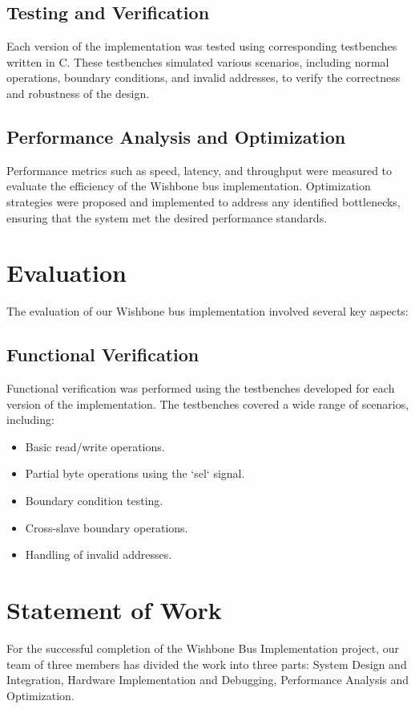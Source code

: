 \documentclass[12pt]{report}
\begin{document}
\subsection{Testing and Verification}
Each version of the implementation was tested using corresponding testbenches written in C. These testbenches simulated various scenarios, including normal operations, boundary conditions, and invalid addresses, to verify the correctness and robustness of the design.

\subsection{Performance Analysis and Optimization}
Performance metrics such as speed, latency, and throughput were measured to evaluate the efficiency of the Wishbone bus implementation. Optimization strategies were proposed and implemented to address any identified bottlenecks, ensuring that the system met the desired performance standards.




\section{Evaluation}

The evaluation of our Wishbone bus implementation involved several key aspects:

\subsection{Functional Verification}
Functional verification was performed using the testbenches developed for each version of the implementation. The testbenches covered a wide range of scenarios, including:
\begin{itemize}
    \item Basic read/write operations.
    \item Partial byte operations using the `sel` signal.
    \item Boundary condition testing.
    \item Cross-slave boundary operations.
    \item Handling of invalid addresses.
\end{itemize}




\section{Statement of Work}
For the successful completion of the Wishbone Bus Implementation project, our team of three members has divided the work into three parts: System Design and Integration, Hardware Implementation and Debugging, Performance Analysis and Optimization.
\end{document}
